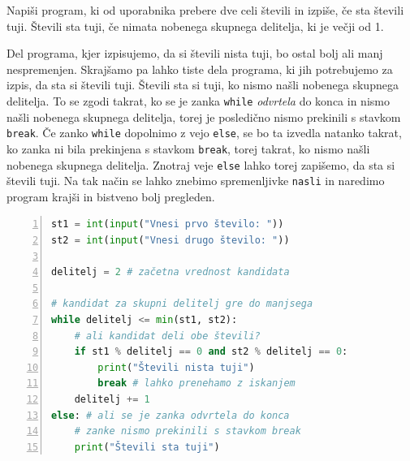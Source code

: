 \begin{zgled}
Napiši program, ki od uporabnika prebere dve celi števili in izpiše, če sta števili tuji. Števili sta tuji, če nimata nobenega skupnega delitelja, ki je večji od 1.
\end{zgled}
\begin{resitev}
Del programa, kjer izpisujemo, da si števili nista tuji, bo ostal bolj ali manj nespremenjen. Skrajšamo pa lahko tiste dela programa, ki jih potrebujemo za izpis, da sta si števili tuji. Števili sta si tuji, ko nismo našli nobenega skupnega delitelja. To se zgodi takrat, ko se je zanka \texttt{while} \emph{odvrtela} do konca in nismo našli nobenega skupnega delitelja, torej je posledično nismo prekinili s stavkom \texttt{break}. Če zanko \texttt{while} dopolnimo z vejo \texttt{else}, se bo ta izvedla natanko takrat, ko zanka ni bila prekinjena s stavkom \texttt{break}, torej takrat, ko nismo našli nobenega skupnega delitelja. Znotraj veje \texttt{else} lahko torej zapišemo, da sta si števili tuji. Na tak način se lahko znebimo spremenljivke \texttt{nasli} in naredimo program krajši in bistveno bolj pregleden.
\begin{lstlisting}[language=Python,numbers=left]
st1 = int(input("Vnesi prvo število: "))
st2 = int(input("Vnesi drugo število: "))

delitelj = 2 # začetna vrednost kandidata

# kandidat za skupni delitelj gre do manjsega
while delitelj <= min(st1, st2): 
    # ali kandidat deli obe števili?
    if st1 % delitelj == 0 and st2 % delitelj == 0:
        print("Števili nista tuji")
        break # lahko prenehamo z iskanjem
    delitelj += 1 
else: # ali se je zanka odvrtela do konca
    # zanke nismo prekinili s stavkom break
    print("Števili sta tuji")
\end{lstlisting}
\end{resitev}